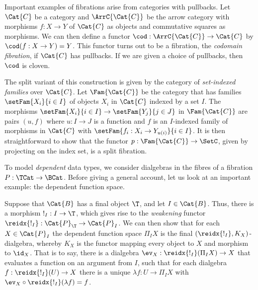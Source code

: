 \documentclass[preprint]{sigplanconf}
\begin{document}
\begin{example}
  Important examples of fibrations arise from categories with pullbacks.
  Let $\Cat{C}$ be a category and $\ArrC{\Cat{C}}$ be the arrow category with
  morphisms $f : X \to Y$ of $\Cat{C}$ as objects and commutative squares as
  morphisms.
  We can then define a functor $\cod : \ArrC{\Cat{C}} \to \Cat{C}$ by
  $\cod(f : X \to Y) = Y$.
  This functor turns out to be a fibration, the \emph{codomain fibration},
  if $\Cat{C}$ has pullbacks.
  If we are given a choice of pullbacks, then $\cod$ is cloven.

  The split variant of this construction is given by the category of
  \emph{set-indexed families} over $\Cat{C}$.
  Let $\Fam{\Cat{C}}$ be the category that has families $\setFam{X_i}{i \in I}$
  of objects $X_i$ in $\Cat{C}$ indexed by a set $I$.
  The morphisms $\setFam{X_i}{i \in I} \to \setFam{Y_j}{j \in J}$ in
  $\Fam{\Cat{C}}$ are pairs $(u, f)$ where $u : I \to J$ is a function and $f$
  is an $I$-indexed family of morphisms in $\Cat{C}$ with
  $\setFam{f_i : X_i \to Y_{u(i)}}{i \in I}$.
  It is then straightforward to show that the functor
  $p : \Fam{\Cat{C}} \to \SetC$, given by projecting on the index set,
  is a split fibration.
  \qedDef
\end{example}

To model \emph{dependent} data types, we consider dialgebras in the fibres of a
fibration $P : \TCat \to \BCat$.
Before giving a general account, let us look at an important example:
the dependent function space.
\begin{example}
  Suppose that $\Cat{B}$ has a final object $\T$, and let $I \in \Cat{B}$.
  Thus, there is a morphism $!_{I} : I \to \T$, which gives rise
  to the \emph{weakening} functor
  $\reidx{!_{I}} : \Cat{P}_{\T} \to \Cat{P}_{I}$.
  We can then show that for each $X \in \Cat{P}_I$ the dependent function space
  $\Pi_I X$ is the final $(\reidx{!_{I}}, K_X)$-dialgebra, whereby $K_X$ is
  the functor mapping every object to $X$ and morphism to $\id_X$.
  That is to say, there is a dialgebra $\ev_X : \reidx{!_{I}}(\Pi_I X) \to X$
  that evaluates a function on an argument from $I$, such that for each
  dialgebra $f : \reidx{!_{I}}(U) \to X$ there is a unique
  $\lambda f : U \to \Pi_I X$ with $\ev_X \circ \reidx{!_{I}}(\lambda f) = f$.
  \qedDef
\end{example}
\end{document}
